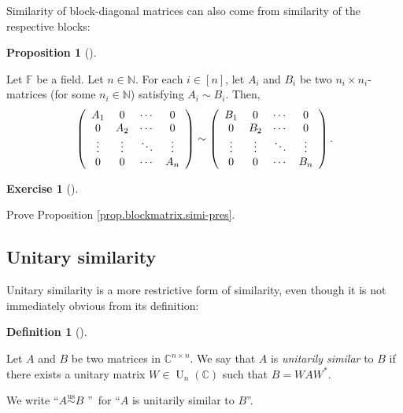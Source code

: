 \documentclass[numbers=enddot,12pt,final,onecolumn,notitlepage]{scrartcl}%
\newcounter{exer}
\numberwithin{exer}{subsection}
\theoremstyle{definition}
\newtheorem{prop}[theo]{Proposition}
\newenvironment{proposition}[1][]
{\begin{prop}[#1]\begin{leftbar}}
{\end{leftbar}\end{prop}}
\newtheorem{defi}[theo]{Definition}
\newenvironment{definition}[1][]
{\begin{defi}[#1]\begin{leftbar}}
{\end{leftbar}\end{defi}}
\newtheorem{exmp}[exer]{Exercise}
\newenvironment{exercise}[1][]
{\begin{exmp}[#1]\begin{leftbar}}
{\end{leftbar}\end{exmp}}
\begin{document}
Similarity of block-diagonal matrices can also come from similarity of the
respective blocks:

\begin{proposition}
\label{prop.blockmatrix.simi-pres}Let $\mathbb{F}$ be a field. Let
$n\in\mathbb{N}$. For each $i\in\left[  n\right]  $, let $A_{i}$ and $B_{i}$
be two $n_{i}\times n_{i}$-matrices (for some $n_{i}\in\mathbb{N}$) satisfying
$A_{i}\sim B_{i}$. Then,%
\[
\left(
\begin{array}
[c]{cccc}%
A_{1} & 0 & \cdots & 0\\
0 & A_{2} & \cdots & 0\\
\vdots & \vdots & \ddots & \vdots\\
0 & 0 & \cdots & A_{n}%
\end{array}
\right)  \sim\left(
\begin{array}
[c]{cccc}%
B_{1} & 0 & \cdots & 0\\
0 & B_{2} & \cdots & 0\\
\vdots & \vdots & \ddots & \vdots\\
0 & 0 & \cdots & B_{n}%
\end{array}
\right)  .
\]

\end{proposition}

\begin{exercise}
\label{exe.blockmatrix.simi-pres} Prove Proposition
\ref{prop.blockmatrix.simi-pres}.
\end{exercise}

\subsection{Unitary similarity}

Unitary similarity is a more restrictive form of similarity, even though it is
not immediately obvious from its definition:

\begin{definition}
\label{def.schurtri.unisim.def}Let $A$ and $B$ be two matrices in
$\mathbb{C}^{n\times n}$. We say that $A$ is \emph{unitarily similar} to $B$
if there exists a unitary matrix $W\in\operatorname*{U}\nolimits_{n}\left(
\mathbb{C}\right)  $ such that $B=WAW^{\ast}$.

We write \textquotedblleft$A\overset{\operatorname*{us}}{\sim}B$%
\textquotedblright\ for \textquotedblleft$A$ is unitarily similar to
$B$\textquotedblright.
\end{definition}
\end{document}
